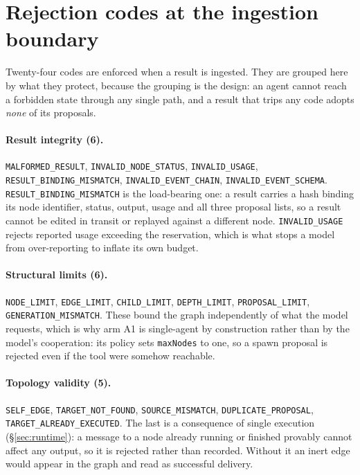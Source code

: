 \documentclass[10pt]{article}
\begin{document}
\label{marker:endbody}



\appendix

\section{Rejection codes at the ingestion boundary}
\label{app:codes}

Twenty-four codes are enforced when a result is ingested. They are grouped here
by what they protect, because the grouping is the design: an agent cannot reach
a forbidden state through any single path, and a result that trips any code
adopts \emph{none} of its proposals.

\paragraph{Result integrity (6).}
\texttt{MALFORMED\_RESULT}, \texttt{INVALID\_NODE\_STATUS},
\texttt{INVALID\_USAGE}, \texttt{RESULT\_BINDING\_MISMATCH},
\texttt{INVALID\_EVENT\_CHAIN}, \texttt{INVALID\_EVENT\_SCHEMA}.
\texttt{RESULT\_BINDING\_MISMATCH} is the load-bearing one: a result carries a
hash binding its node identifier, status, output, usage and all three proposal
lists, so a result cannot be edited in transit or replayed against a different
node. \texttt{INVALID\_USAGE} rejects reported usage exceeding the reservation,
which is what stops a model from over-reporting to inflate its own budget.

\paragraph{Structural limits (6).}
\texttt{NODE\_LIMIT}, \texttt{EDGE\_LIMIT}, \texttt{CHILD\_LIMIT},
\texttt{DEPTH\_LIMIT}, \texttt{PROPOSAL\_LIMIT}, \texttt{GENERATION\_MISMATCH}.
These bound the graph independently of what the model requests, which is why
arm A1 is single-agent by construction rather than by the model's cooperation:
its policy sets \texttt{maxNodes} to one, so a spawn proposal is rejected even
if the tool were somehow reachable.

\paragraph{Topology validity (5).}
\texttt{SELF\_EDGE}, \texttt{TARGET\_NOT\_FOUND}, \texttt{SOURCE\_MISMATCH},
\texttt{DUPLICATE\_PROPOSAL}, \texttt{TARGET\_ALREADY\_EXECUTED}.
The last is a consequence of single execution (§\ref{sec:runtime}): a message to
a node already running or finished provably cannot affect any output, so it is
rejected rather than recorded. Without it an inert edge would appear in the
graph and read as successful delivery.
\end{document}
